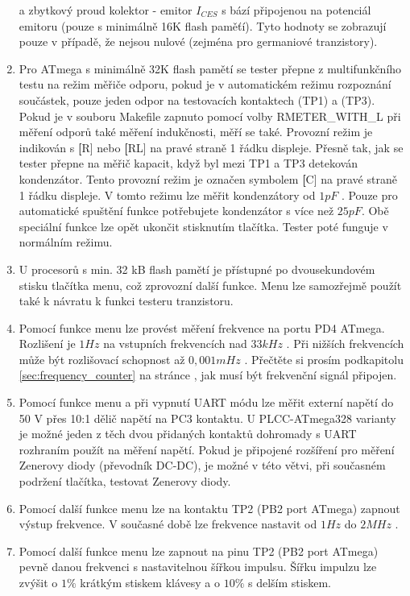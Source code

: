 \begin{enumerate}
a zbytkový proud kolektor - emitor  \(I_{CES}\) s bází připojenou na potenciál emitoru (pouze s minimálně 16K flash paměťí).
Tyto hodnoty se zobrazují pouze v případě, že nejsou nulové (zejména pro germaniové tranzistory).
\item Pro ATmega s minimálně 32K flash pamětí se tester přepne z multifunkčního testu na režim
měřiče odporu, pokud je v automatickém režimu rozpoznání součástek, pouze jeden odpor na testovacích kontaktech (TP1) a (TP3). Pokud je v souboru Makefile zapnuto pomocí volby RMETER\_WITH\_L při měření odporů také měření indukčnosti, měří se také. Provozní režim je indikován s {\textbf[R]} nebo {\textbf[RL]} na pravé straně 1 řádku displeje. Přesně tak, jak se tester přepne na měřič kapacit, když byl mezi TP1 a TP3 detekován kondenzátor.
Tento provozní režim je označen symbolem {\textbf[C]} na pravé straně 1 řádku displeje.
V tomto režimu lze měřit kondenzátory  od \(1pF\) . Pouze pro automatické spuštění funkce
potřebujete kondenzátor s více než \(25pF\).
Obě speciální funkce lze opět ukončit stisknutím tlačítka. Tester poté funguje v normálním režimu.
\item U procesorů s min. 32 kB flash pamětí je přístupné po dvousekundovém stisku tlačítka menu, což zprovozní další funkce. Menu lze samozřejmě použít také k návratu k funkci testeru tranzistoru.
\item Pomocí funkce menu lze provést měření frekvence na portu PD4 ATmega.
Rozlišení je  \(1Hz\) na vstupních frekvencích nad \(33kHz\) .
Při nižších frekvencích může být rozlišovací schopnost až \(0,001mHz\) .
Přečtěte si prosím podkapitolu \ref{sec:frequency_counter} na stránce \pageref{sec:frequency_counter},
jak musí být frekvenční signál připojen.
\item Pomocí funkce menu a při vypnutí UART módu lze měřit externí napětí do 50 V přes 10:1 dělič napětí na PC3 kontaktu. U PLCC-ATmega328 varianty je možné jeden z těch dvou přidaných kontaktů dohromady s UART rozhraním použít na měření napětí. Pokud je připojené rozšíření pro měření Zenerovy diody (převodník DC-DC), je možné v této větvi, při současném podržení tlačítka, testovat Zenerovy diody.
\item Pomocí další funkce menu lze na kontaktu TP2 (PB2 port ATmega) zapnout výstup frekvence.
V současné době lze frekvence nastavit od \(1Hz\) do \(2MHz\) .
\item Pomocí další funkce menu lze zapnout na pinu TP2 (PB2 port ATmega) pevně danou frekvenci s nastavitelnou šířkou impulsu.
Šířku impulzu lze zvýšit o \(1\%\) krátkým stiskem klávesy a o \(10\%\) s delším stiskem.

\end{enumerate}
